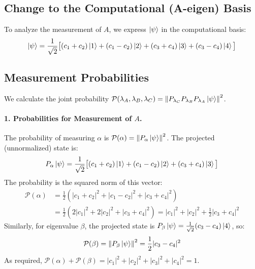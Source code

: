\documentclass[11pt,a4paper]{article}
\begin{document}
\subsection{Change to the Computational (A-eigen) Basis}
To analyze the measurement of $A$, we express $\ket{\psi}$ in the computational
basis:
$$
\ket{\psi} = \frac{1}{\sqrt{2}} \big[ (c_1+c_2)\ket{1} + (c_1-c_2)\ket{2} +
(c_3+c_4)\ket{3} + (c_3-c_4)\ket{4} \big]
$$

\subsection{Measurement Probabilities}
We calculate the joint probability $\mathcal{P}(\lambda_A, \lambda_B, \lambda_C)
= \norm{P_{\lambda_C} P_{\lambda_B} P_{\lambda_A} \ket{\psi}}^2$.

\paragraph{1. Probabilities for Measurement of $A$.}
The probability of measuring $\alpha$ is $\mathcal{P}(\alpha) = \norm{P_\alpha
\ket{\psi}}^2$. The projected (unnormalized) state is:
$$ P_\alpha \ket{\psi} = \frac{1}{\sqrt{2}} \big[ (c_1+c_2)\ket{1} +
(c_1-c_2)\ket{2} + (c_3+c_4)\ket{3} \big] $$
The probability is the squared norm of this vector:
\begin{align*}
  \mathcal{P}(\alpha) &= \frac{1}{2} \left( |c_1+c_2|^2 + |c_1-c_2|^2 +
  |c_3+c_4|^2 \right) \\
                      &= \frac{1}{2} \left( 2|c_1|^2 + 2|c_2|^2 + |c_3+c_4|^2
                      \right) = |c_1|^2 + |c_2|^2 + \frac{1}{2}|c_3+c_4|^2
\end{align*}
Similarly, for eigenvalue $\beta$, the projected state is $P_\beta \ket{\psi} =
\frac{1}{\sqrt{2}}(c_3-c_4)\ket{4}$, so:
$$ \mathcal{P}(\beta) = \norm{P_\beta \ket{\psi}}^2 = \frac{1}{2}|c_3-c_4|^2 $$
As required, $\mathcal{P}(\alpha) + \mathcal{P}(\beta) =
|c_1|^2+|c_2|^2+|c_3|^2+|c_4|^2 = 1$.
\end{document}
